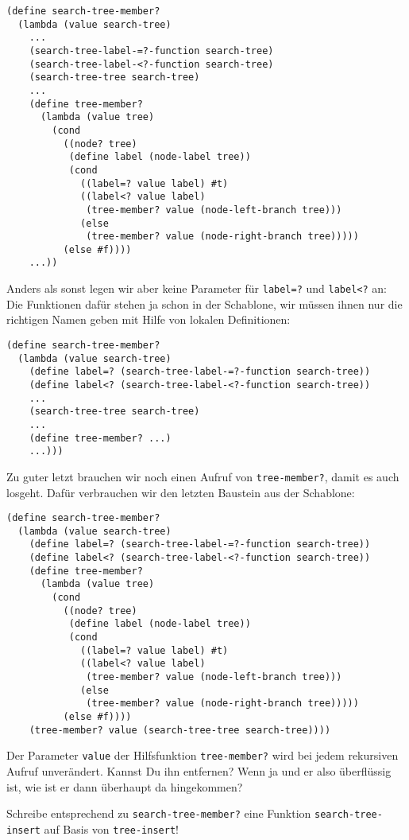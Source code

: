 %
\begin{lstlisting}
(define search-tree-member?
  (lambda (value search-tree)
    ...
    (search-tree-label-=?-function search-tree)
    (search-tree-label-<?-function search-tree)
    (search-tree-tree search-tree)
    ...
    (define tree-member?
      (lambda (value tree)
        (cond
          ((node? tree)
           (define label (node-label tree))
           (cond
             ((label=? value label) #t)
             ((label<? value label)
              (tree-member? value (node-left-branch tree)))
             (else
              (tree-member? value (node-right-branch tree)))))
          (else #f))))
    ...))
\end{lstlisting}
%
Anders als sonst legen wir aber keine Parameter für
\lstinline{label=?} und \lstinline{label<?} an: Die Funktionen
dafür stehen ja schon in der Schablone, wir müssen ihnen nur die
richtigen Namen geben mit Hilfe von lokalen Definitionen:
%
\begin{lstlisting}
(define search-tree-member?
  (lambda (value search-tree)
    (define label=? (search-tree-label-=?-function search-tree))
    (define label<? (search-tree-label-<?-function search-tree))
    ...
    (search-tree-tree search-tree)
    ...
    (define tree-member? ...)
    ...)))
\end{lstlisting}
%
Zu guter letzt brauchen wir noch einen Aufruf von \lstinline{tree-member?}, damit es auch losgeht.
Dafür verbrauchen wir den letzten Baustein aus der Schablone:
%
\begin{lstlisting}
(define search-tree-member?
  (lambda (value search-tree)
    (define label=? (search-tree-label-=?-function search-tree))
    (define label<? (search-tree-label-<?-function search-tree))
    (define tree-member?
      (lambda (value tree)
        (cond
          ((node? tree)
           (define label (node-label tree))
           (cond
             ((label=? value label) #t)
             ((label<? value label)
              (tree-member? value (node-left-branch tree)))
             (else
              (tree-member? value (node-right-branch tree)))))
          (else #f))))
    (tree-member? value (search-tree-tree search-tree))))
\end{lstlisting}
%
\begin{aufgabeinline}
  Der Parameter \lstinline{value} der Hilfsfunktion \lstinline{tree-member?}
  wird bei jedem rekursiven Aufruf unverändert.  Kannst Du ihn
  entfernen?  Wenn ja und er also überflüssig ist, wie ist er dann
  überhaupt da hingekommen?
\end{aufgabeinline}
\begin{aufgabeinline}
  Schreibe entsprechend zu \lstinline{search-tree-member?} eine
  Funktion \lstinline{search-tree-insert} auf Basis von
  \lstinline{tree-insert}!
\end{aufgabeinline}

